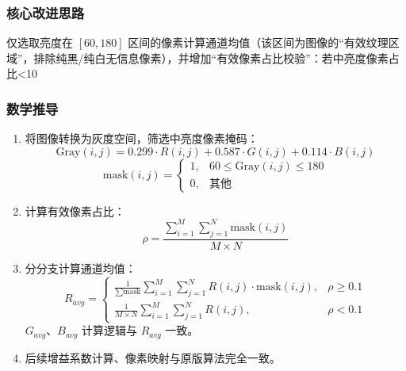 \documentclass[12pt,a4paper,UTF8]{ctexart} %
\begin{document}
\subsubsection{核心改进思路}
仅选取亮度在 $[60, 180]$ 区间的像素计算通道均值（该区间为图像的“有效纹理区域”，排除纯黑/纯白无信息像素），并增加“有效像素占比校验”：若中亮度像素占比<10%

\subsubsection{数学推导}
\begin{enumerate}
    \item 将图像转换为灰度空间，筛选中亮度像素掩码：
    \[
    \text{Gray}(i,j) = 0.299 \cdot R(i,j) + 0.587 \cdot G(i,j) + 0.114 \cdot B(i,j)
    \]
    \[
    \text{mask}(i,j) = 
    \begin{cases}
    1, & 60 \leq \text{Gray}(i,j) \leq 180 \\
    0, & \text{其他}
    \end{cases}
    \]
    
    \item 计算有效像素占比：
    \[
    \rho = \frac{\sum_{i=1}^{M}\sum_{j=1}^{N} \text{mask}(i,j)}{M \times N}
    \]
    
    \item 分分支计算通道均值：
    \[
    R_{avg} = 
    \begin{cases}
    \frac{1}{\sum \text{mask}} \sum_{i=1}^{M}\sum_{j=1}^{N} R(i,j) \cdot \text{mask}(i,j), & \rho \geq 0.1 \\
    \frac{1}{M \times N} \sum_{i=1}^{M}\sum_{j=1}^{N} R(i,j), & \rho < 0.1
    \end{cases}
    \]
    $G_{avg}$、$B_{avg}$ 计算逻辑与 $R_{avg}$ 一致。
    
    \item 后续增益系数计算、像素映射与原版算法完全一致。
\end{enumerate}
\end{document}
